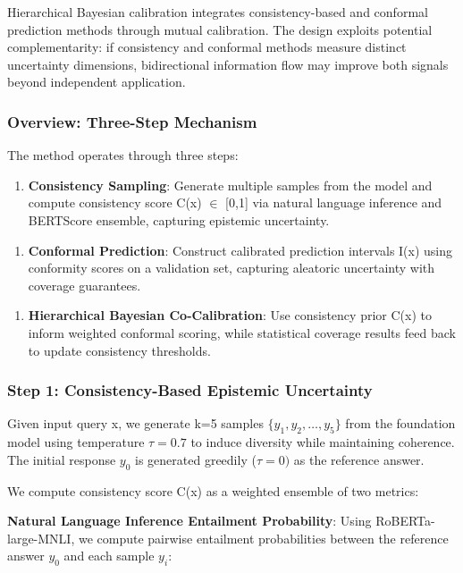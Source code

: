 
Hierarchical Bayesian calibration integrates consistency-based and conformal prediction methods through mutual calibration. The design exploits potential complementarity: if consistency and conformal methods measure distinct uncertainty dimensions, bidirectional information flow may improve both signals beyond independent application.

\subsubsection{Overview: Three-Step Mechanism}

The method operates through three steps:

\begin{enumerate}
\item \textbf{Consistency Sampling}: Generate multiple samples from the model and compute consistency score C(x) $\in$ [0,1] via natural language inference and BERTScore ensemble, capturing epistemic uncertainty.
\end{enumerate}

\begin{enumerate}
\item \textbf{Conformal Prediction}: Construct calibrated prediction intervals I(x) using conformity scores on a validation set, capturing aleatoric uncertainty with coverage guarantees.
\end{enumerate}

\begin{enumerate}
\item \textbf{Hierarchical Bayesian Co-Calibration}: Use consistency prior C(x) to inform weighted conformal scoring, while statistical coverage results feed back to update consistency thresholds.
\end{enumerate}

\subsubsection{Step 1: Consistency-Based Epistemic Uncertainty}

Given input query x, we generate k=5 samples $\{y_1, y_2, \ldots, y_{5}\}$ from the foundation model using temperature $\tau =0.7$ to induce diversity while maintaining coherence. The initial response $y_0$ is generated greedily ($\tau =0)$ as the reference answer.

We compute consistency score C(x) as a weighted ensemble of two metrics:

\textbf{Natural Language Inference Entailment Probability}: Using RoBERTa-large-MNLI, we compute pairwise entailment probabilities between the reference answer $y_0$ and each sample $y_i$:

